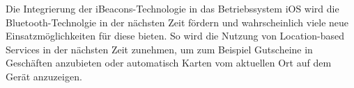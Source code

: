 Die Integrierung der iBeacons-Technologie in das Betriebssystem iOS wird die Bluetooth-Technolgie in der nächsten Zeit fördern und wahrscheinlich viele neue Einsatzmöglichkeiten für diese bieten. So wird die Nutzung von Location-based Services in der nächsten Zeit zunehmen, um zum Beispiel Gutscheine in Geschäften anzubieten oder automatisch Karten vom aktuellen Ort auf dem Gerät anzuzeigen.
